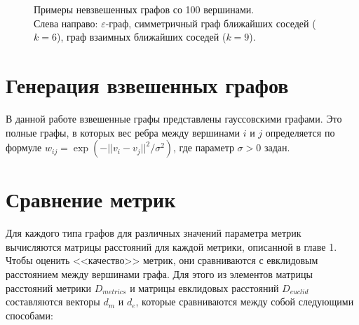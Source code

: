 \begin{figure}[h]
  \begin{minipage}[h]{0.29\linewidth}
  \end{minipage}
  \hfill
  \begin{minipage}[h]{0.29\linewidth}
  \end{minipage}
  \hfill
  \begin{minipage}[h]{0.29\linewidth}
  \end{minipage}
  \caption{Примеры невзвешенных графов со 100 вершинами. \\ Слева направо: $\varepsilon$-граф, симметричный граф ближайших соседей ($k=6$), граф взаимных ближайших соседей ($k=9$).}
  \label{img:graphs}  
\end{figure}


\section{Генерация взвешенных графов} \label{sect2_3}

В данной работе взвешенные графы представлены гауссовскими графами. Это полные графы, в которых вес ребра между вершинами $i$ и $j$ определяется по формуле $w_{ij} = \exp(-||v_i - v_j||^2 / \sigma^2 )$, где параметр $\sigma > 0$ задан.


\section{Сравнение метрик} \label{sect2_4}

Для каждого типа графов для различных значений параметра метрик вычисляются матрицы расстояний для каждой метрики, описанной в главе 1. Чтобы оценить <<качество>> метрик, они сравниваются с евклидовым расстоянием между вершинами графа. Для этого из элементов матрицы расстояний метрики $D_{metrics}$ и матрицы евклидовых расстояний $D_{euclid}$ составляются векторы $d_{m}$ и $d_{e}$, которые сравниваются между собой следующими способами:

